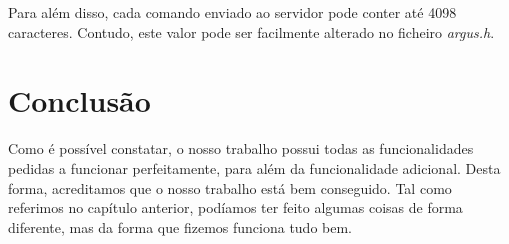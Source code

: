 \documentclass[a4paper]{report}
\begin{document}
	Para além disso, cada comando enviado ao servidor pode conter até 4098 caracteres. Contudo, este valor pode ser facilmente alterado no ficheiro \emph{argus.h}.

	\chapter{Conclusão}
	
	Como é possível constatar, o nosso trabalho possui todas as funcionalidades pedidas a funcionar perfeitamente, para além da funcionalidade adicional. Desta forma, acreditamos que o nosso trabalho está bem conseguido. Tal como referimos no capítulo anterior, podíamos ter feito algumas coisas de forma diferente, mas da forma que fizemos funciona tudo bem.
\end{document}
